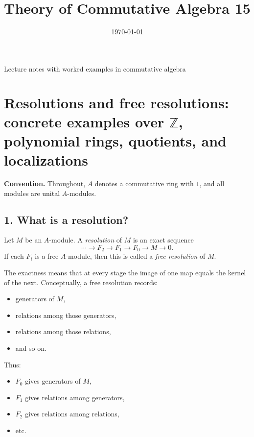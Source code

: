 \documentclass[12pt,a4paper]{article}
\title{\vspace{-1.5em}\bfseries Theory of Commutative Algebra 15}
\author{}
\date{\today}
\theoremstyle{notespace}
\theoremstyle{definition}
\begin{document}
	\maketitle
	\thispagestyle{plain}
		\begin{center}
		\begin{minipage}{0.92\textwidth}
			Lecture notes with worked examples in commutative algebra
		\end{minipage}
	\end{center}
		\tableofcontents
	\clearpage


\section{Resolutions and free resolutions: concrete examples over \(\mathbb Z\), polynomial rings, quotients, and localizations}

\textbf{Convention.}
Throughout, \(A\) denotes a commutative ring with \(1\), and all modules are unital \(A\)-modules.

\subsection{1. What is a resolution?}

Let \(M\) be an \(A\)-module. A \emph{resolution} of \(M\) is an exact sequence
\[
\cdots \longrightarrow F_2 \longrightarrow F_1 \longrightarrow F_0 \longrightarrow M \longrightarrow 0.
\]
If each \(F_i\) is a free \(A\)-module, then this is called a \emph{free resolution} of \(M\).

The exactness means that at every stage the image of one map equals the kernel of the next. Conceptually, a free resolution records:
\begin{itemize}
	\item generators of \(M\),
	\item relations among those generators,
	\item relations among those relations,
	\item and so on.
\end{itemize}

Thus:
\begin{itemize}
	\item \(F_0\) gives generators of \(M\),
	\item \(F_1\) gives relations among generators,
	\item \(F_2\) gives relations among relations,
	\item etc.
\end{itemize}
\end{document}
